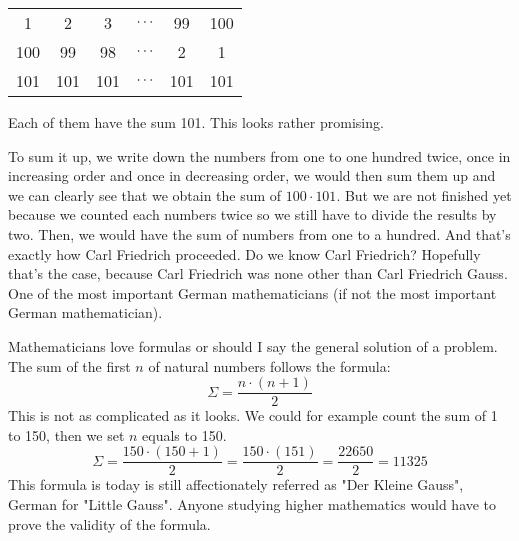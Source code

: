 \begin{center}
	\begin{tabular}{cccccc}
		1   & 2  & 3  & $\mathellipsis$ & 99 & 100 \\
		100 & 99 & 98 & $\mathellipsis$ & 2  & 1  \\
		101 & 101 & 101 & $\mathellipsis$ & 101 & 101
	\end{tabular}
\end{center}

\noindent Each of them have the sum 101. This looks rather promising. 

\vspace{5mm} %

\noindent To sum it up, we write down the numbers from one to one hundred twice, once in increasing order and once in decreasing order, we would then sum them up and we can clearly see that we obtain the sum of $100 \cdot 101$. But we are not finished yet because we counted each numbers twice so we still have to divide the results by two. Then, we would have the sum of numbers from one to a hundred. And that's exactly how Carl Friedrich proceeded. Do we know Carl Friedrich? Hopefully that's the case, because Carl Friedrich was none other than Carl Friedrich Gauss. One of the most important German mathematicians (if not the most important German mathematician).

\vspace{5mm} %


\vspace{5mm} %

\noindent Mathematicians love formulas or should I say the general solution of a problem. The sum of the first $n$ of natural numbers follows the formula:
\begin{equation}
	\Sigma = \frac{n\cdot(n+1)}{2}
\end{equation}
\noindent This is not as complicated as it looks. We could for example count the sum of 1 to 150, then we set $n$ equals to 150.
\begin{equation}
	\Sigma = \frac{150\cdot(150+1)}{2}= \frac{150\cdot(151)}{2}= \frac{22650}{2}=11325
\end{equation}
\noindent This formula is today is still affectionately referred as "Der Kleine Gauss", German for "Little Gauss". Anyone studying higher mathematics would have to prove the validity of the formula.